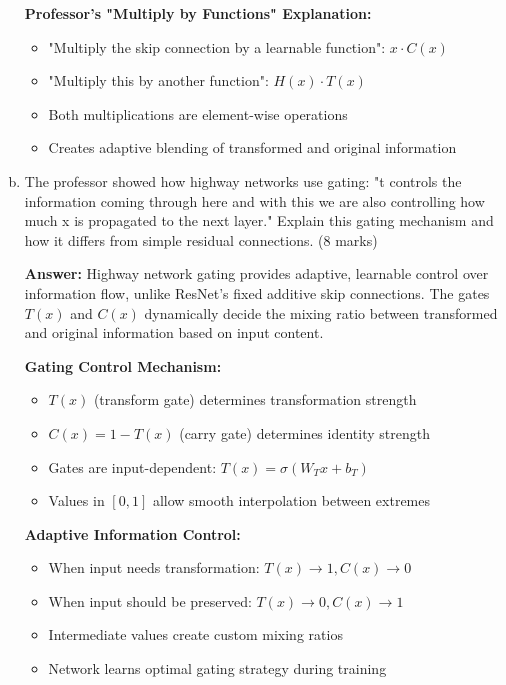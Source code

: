 \documentclass[12pt]{article}
\newcommand{\answer}[1]{{\color{answercolor}\textbf{Answer:} #1}}
\newcommand{\explanation}[1]{{\color{explanationcolor}#1}}
\begin{document}
\begin{enumerate}[(a)]
{    \textbf{Professor's "Multiply by Functions" Explanation:}
    \begin{itemize}
        \item "Multiply the skip connection by a learnable function": $x \cdot C(x)$
        \item "Multiply this by another function": $H(x) \cdot T(x)$
        \item Both multiplications are element-wise operations
        \item Creates adaptive blending of transformed and original information
    \end{itemize}
    }
    
    \item The professor showed how highway networks use gating: "t controls the information coming through here and with this we are also controlling how much x is propagated to the next layer." Explain this gating mechanism and how it differs from simple residual connections. \hfill (8 marks)
    
    \answer{Highway network gating provides adaptive, learnable control over information flow, unlike ResNet's fixed additive skip connections. The gates $T(x)$ and $C(x)$ dynamically decide the mixing ratio between transformed and original information based on input content.}
    
    \explanation{
    \textbf{Gating Control Mechanism:}
    \begin{itemize}
        \item $T(x)$ (transform gate) determines transformation strength
        \item $C(x) = 1 - T(x)$ (carry gate) determines identity strength
        \item Gates are input-dependent: $T(x) = \sigma(W_T x + b_T)$
        \item Values in $[0,1]$ allow smooth interpolation between extremes
    \end{itemize}
    
    \textbf{Adaptive Information Control:}
    \begin{itemize}
        \item When input needs transformation: $T(x) \to 1, C(x) \to 0$
        \item When input should be preserved: $T(x) \to 0, C(x) \to 1$
        \item Intermediate values create custom mixing ratios
        \item Network learns optimal gating strategy during training
    \end{itemize}
    
}
\end{enumerate}
\end{document}
